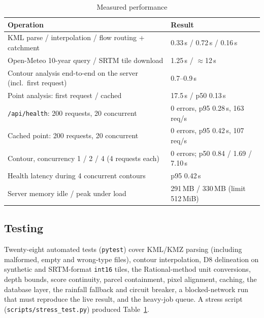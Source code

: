 \documentclass[manuscript,screen,review]{acmart}
\begin{document}
\begin{table}[h]
  \caption{Measured performance}
  \label{tab:perf}
  \begin{tabular}{p{8.2cm}p{4.8cm}}
    \toprule
    Operation & Result \\
    \midrule
    KML parse / interpolation / flow routing + catchment & 0.33\,s / 0.72\,s / 0.16\,s \\
    Open-Meteo 10-year query / SRTM tile download & 1.25\,s / $\approx$12\,s \\
    Contour analysis end-to-end on the server (incl.\ first request) & 0.7--0.9\,s \\
    Point analysis: first request / cached & 17.5\,s / p50 0.13\,s \\
    \texttt{/api/health}: 200 requests, 20 concurrent & 0 errors, p95 0.28\,s, 163 req/s \\
    Cached point: 200 requests, 20 concurrent & 0 errors, p95 0.42\,s, 107 req/s \\
    Contour, concurrency 1 / 2 / 4 (4 requests each) & 0 errors; p50 0.84 / 1.69 / 7.10\,s \\
    Health latency during 4 concurrent contours & p95 0.42\,s \\
    Server memory idle / peak under load & 291\,MB / 330\,MB (limit 512\,MiB) \\
    \bottomrule
  \end{tabular}
\end{table}

\subsection{Testing}
\label{sec:testing}
Twenty-eight automated tests (\texttt{pytest}) cover KML/KMZ parsing (including malformed, empty and wrong-type files), contour interpolation, D8 delineation on synthetic and SRTM-format \texttt{int16} tiles, the Rational-method unit conversions, depth bounds, score continuity, parcel containment, pixel alignment, caching, the database layer, the rainfall fallback and circuit breaker, a blocked-network run that must reproduce the live result, and the heavy-job queue. A stress script (\texttt{scripts/stress\_test.py}) produced Table~\ref{tab:perf}.

\end{document}

